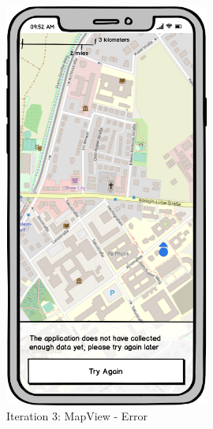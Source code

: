 \begin{figure}[H]
\begin{minipage}[b]{0.45\textwidth}
    \includegraphics[width=0.6\textwidth]{images/UI/Iteration3-MapView-Error.png}
    \caption{Iteration 3: MapView - Error}
    \label{fig:i3-mv-error}
  \end{minipage}
\end{figure}

